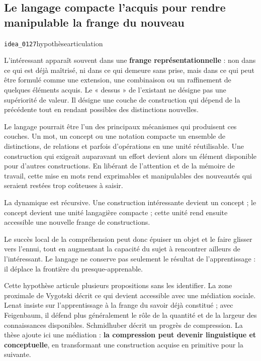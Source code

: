 \documentclass[10pt,a4paper]{article}
\begin{document}
\subsection{Le langage compacte l'acquis pour rendre manipulable la frange du nouveau}
{\small\color{metadata} \texttt{idea\_0127}\quad\textbullet\quad hypothèse\quad\textbullet\quad articulation\par}

L'intéressant apparaît souvent dans une \textbf{frange représentationnelle} : non dans ce qui est déjà maîtrisé, ni dans ce qui demeure sans prise, mais dans ce qui peut être formulé comme une extension, une combinaison ou un raffinement de quelques éléments acquis. Le « dessus » de l'existant ne désigne pas une supériorité de valeur. Il désigne une couche de construction qui dépend de la précédente tout en rendant possibles des distinctions nouvelles.

Le langage pourrait être l'un des principaux mécanismes qui produisent ces couches. Un mot, un concept ou une notation compacte un ensemble de distinctions, de relations et parfois d'opérations en une unité réutilisable. Une construction qui exigeait auparavant un effort devient alors un élément disponible pour d'autres constructions. En libérant de l'attention et de la mémoire de travail, cette mise en mots rend exprimables et manipulables des nouveautés qui seraient restées trop coûteuses à saisir.

La dynamique est récursive. Une construction intéressante devient un concept ; le concept devient une unité langagière compacte ; cette unité rend ensuite accessible une nouvelle frange de constructions.

Le succès local de la compréhension peut donc épuiser un objet et le faire glisser vers l'ennui, tout en augmentant la capacité du sujet à rencontrer ailleurs de l'intéressant. Le langage ne conserve pas seulement le résultat de l'apprentissage : il déplace la frontière du presque-apprenable.

Cette hypothèse articule plusieurs propositions sans les identifier. La zone proximale de Vygotski décrit ce qui devient accessible avec une médiation sociale. Lenat insiste sur l'apprentissage à la frange du savoir déjà constitué ; avec Feigenbaum, il défend plus généralement le rôle de la quantité et de la largeur des connaissances disponibles. Schmidhuber décrit un progrès de compression. La thèse ajoute ici une médiation : \textbf{la compression peut devenir linguistique et conceptuelle}, en transformant une construction acquise en primitive pour la suivante.
\end{document}
